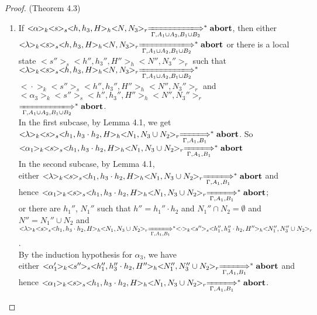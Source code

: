 \documentclass{lmcs} %
\theoremstyle{plain}\newtheorem{satz}[thm]{Satz} %
\begin{document}
\begin{proof}{(Theorem 4.3)}
\begin{itemize}
    \begin{enumerate}
      \item If $<\!\!\alpha\!\!>_k<\!\!s\!\!>_s<\!\!h,h_3,H\!\!>_h<\!\!N,N_3\!\!>_r\xLongrightarrow[\Gamma, A_1\cup A_2, B_1\cup B_2]{}^*\mathbf{abort}$, then either $<\!\!\lambda\!\!>_k<\!\!s\!\!>_s<\!\!h,h_3,H\!\!>_h<\!\!N,N_3\!\!>_r\xLongrightarrow[\Gamma, A_1\cup A_2, B_1\cup B_2]{}^*\mathbf{abort}$ or there is a local state $<\!\!s''\!\!>_s<\!\!h'',h_3'',H''\!\!>_h<\!\!N'',N_3''\!\!>_r$ such that $<\!\!\lambda\!\!>_k<\!\!s\!\!>_s<\!\!h,h_3,H\!\!>_h<\!\!N,N_3\!\!>_r\xLongrightarrow[\Gamma, A_1\cup A_2, B_1\cup B_2]{}^*$\\$<\!\!\cdot\!\!>_k<\!\!s''\!\!>_s<\!\!h'',h_3'',H''\!\!>_h<\!\!N'',N_3''\!\!>_r$ and $<\!\!\alpha_3\!\!>_k<\!\!s''\!\!>_s<\!\!h'',h_3'',H''\!\!>_h<\!\!N'',N_3''\!\!>_r$\\$\xLongrightarrow[\Gamma, A_1\cup A_2, B_1\cup B_2]{}^*\mathbf{abort}$.\\
          In the first subcase, by Lemma 4.1, we get $<\!\!\lambda\!\!>_k<\!\!s\!\!>_s<\!\!h_1,h_3\cdot h_2,H\!\!>_h<\!\!N_1,N_3\cup N_2\!\!>_r\xLongrightarrow[\Gamma, A_1,B_1]{}^*\mathbf{abort}$. So $<\!\!\alpha_1\!\!>_k<\!\!s\!\!>_s<\!\!h_1,h_3\cdot h_2,H\!\!>_h<\!\!N_1,N_3\cup N_2\!\!>_r\xLongrightarrow[\Gamma, A_1,B_1]{}^*\mathbf{abort}$\\
          In the second subcase, by Lemma 4.1,\\
           either $<\!\!\lambda\!\!>_k<\!\!s\!\!>_s<\!\!h_1,h_3\cdot h_2,H\!\!>_h<\!\!N_1,N_3\cup N_2\!\!>_r\xLongrightarrow[\Gamma, A_1,B_1]{}^*\mathbf{abort}$ and  hence $<\!\!\alpha_1\!\!>_k<\!\!s\!\!>_s<\!\!h_1,h_3\cdot h_2,H\!\!>_h<\!\!N_1,N_3\cup N_2\!\!>_r\xLongrightarrow[\Gamma, A_1,B_1]{}^*\mathbf{abort}$;\\
            or there are $h_1''$, $N_1''$ such that $h''=h_1''\cdot h_2$ and $N_1''\cap N_2=\emptyset$ and $N''=N_1''\cup N_2$ and $<\!\!\lambda\!\!>_k<\!\!s\!\!>_s<\!\!h_1,h_3\cdot h_2,H\!\!>_h<\!\!N_1,N_3\cup N_2\!\!>_r\xLongrightarrow[\Gamma, A_1, B_1]{}^*<\!\!\cdot\!\!>_k<\!\!s''\!\!>_s<\!\!h_1'',h_3''\cdot h_2,H''\!\!>_h<\!\!N_1'',N_3''\cup N_2\!\!>_r$.\\
            By the induction hypothesis for $\alpha_3$, we have \\
            either $<\!\!\alpha_1'\!\!>_k<\!\!s''\!\!>_s<\!\!h_1'',h_3''\cdot h_2,H''\!\!>_h<\!\!N_1'',N_3''\cup N_2\!\!>_r\xLongrightarrow[\Gamma, A_1,B_1]{}^*\mathbf{abort}$ and hence $<\!\!\alpha_1\!\!>_k<\!\!s\!\!>_s<\!\!h_1,h_3\cdot h_2,H\!\!>_h<\!\!N_1,N_3\cup N_2\!\!>_r\xLongrightarrow[\Gamma, A_1,B_1]{}^*\mathbf{abort}$.\\

\end{enumerate}
\end{itemize}
\end{proof}
\end{document}
